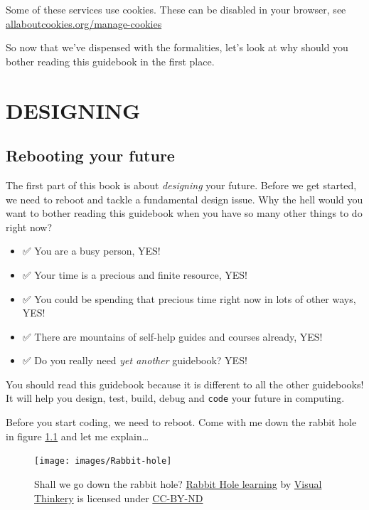 \documentclass[
]{book}
\providecommand{\tightlist}{%
  \setlength{\itemsep}{0pt}\setlength{\parskip}{0pt}}
\begin{document}
Some of these services use cookies. These can be disabled in your browser, see \href{https://www.allaboutcookies.org/manage-cookies/}{allaboutcookies.org/manage-cookies}

So now that we've dispensed with the formalities, let's look at why should you bother reading this guidebook in the first place.











\hypertarget{part-designing}{%
\part{DESIGNING}\label{part-designing}}

\hypertarget{rebooting}{%
\chapter{Rebooting your future}\label{rebooting}}

The first part of this book is about \emph{designing} your future. Before we get started, we need to reboot and tackle a fundamental design issue. Why the hell would you want to bother reading this guidebook when you have so many other things to do right now?

\begin{itemize}
\tightlist
\item
  ✅ You are a busy person, YES!
\item
  ✅ Your time is a precious and finite resource, YES!
\item
  ✅ You could be spending that precious time right now in lots of other ways, YES!
\item
  ✅ There are mountains of self-help guides and courses already, YES!
\item
  ✅ Do you really need \emph{yet another} guidebook? YES!
\end{itemize}

You should read this guidebook because it is different to all the other guidebooks! It will help you design, test, build, debug and \texttt{code} your future in computing.

Before you start coding, we need to reboot. Come with me down the rabbit hole in figure \ref{fig:rabbit-fig} and let me explain\ldots{} 🐇

\begin{figure}

{\centering \texttt{[image: images/Rabbit-hole]} 

}

\caption{Shall we go down the rabbit hole? \href{https://bryanmmathers.com/rabbit-hole-learning/}{Rabbit Hole learning} by \href{https://visualthinkery.com}{Visual Thinkery} is licensed under \href{https://creativecommons.org/licenses/by-nd/4.0/}{CC-BY-ND}}\label{fig:rabbit-fig}
\end{figure}
\end{document}
